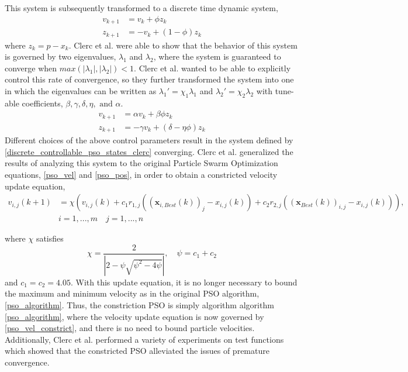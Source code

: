 This system is subsequently transformed to a discrete time dynamic system, 
\begin{equation} \label{discrete_pso_states_clerc}
   \begin{aligned}
    v_{k+1} &= v_k + \phi z_k  \\
    z_{k+1} &= -v_{k} + (1-\phi)z_{k} 
    \end{aligned} 
\end{equation}
where $z_k = p - x_k$. Clerc et al. were able to show that the behavior of this system is governed by two eigenvalues, $\lambda_1$ and $\lambda_2$, where the system is guaranteed to converge when $max(|\lambda_1|,|\lambda_2|) < 1$. Clerc et al. wanted to be able to explicitly control this rate of convergence, so they further transformed the system into one in which the eigenvalues can be written as $\lambda_1' = \chi_1 \lambda_1$ and $\lambda_2' = \chi_2 \lambda_2$ with tune-able
coefficients, $\beta, \gamma, \delta, \eta, \textrm{ and } \alpha$.
\begin{equation} \label{discrete_controllable_pso_states_clerc}
   \begin{aligned}
    v_{k+1} &= \alpha v_k + \beta \phi z_k  \\
    z_{k+1} &= -\gamma v_{k} + (\delta- \eta \phi)z_{k} 
    \end{aligned} 
\end{equation}
Different choices of the above control parameters result in the system defined by \ref{discrete_controllable_pso_states_clerc} converging. Clerc et al. generalized the results of analyzing this system to the original Particle Swarm Optimization equations, \ref{pso_vel} and \ref{pso_pos}, in order to obtain a constricted velocity update equation,
\begin{equation} \label{pso_vel_constrict}
    \begin{aligned}
    v_{i,j}(k+1) &= \chi (v_{i,j}(k) + c_1 r_{1,j}((\mathbf{x}_{i,Best}(k))_j - x_{i,j}(k)) + c_2 r_{2,j} ((\mathbf{x}_{Best}(k))_{i,j} - x_{i,j}(k))), \\ 
    &i=1,...,m \quad j=1,...,n
    \end{aligned}
\end{equation}

where $\chi$ satisfies
\begin{equation}
    \chi = \frac{2}{|2 - \psi \sqrt{\psi^2 - 4\psi}|}, \quad \psi = c_1 + c_2
\end{equation}
and $c_1=c_2=4.05$. With this update equation, it is no longer necessary to bound the maximum and minimum velocity as in the original PSO algorithm, \ref{pso_algorithm}. Thus, the constriction PSO is simply algorithm  algorithm \ref{pso_algorithm}, where the velocity update equation is now governed by \ref{pso_vel_constrict}, and there is no need to bound particle velocities. Additionally, Clerc et al. performed a variety of experiments on test functions which showed that the constricted PSO alleviated the issues of premature convergence. 

